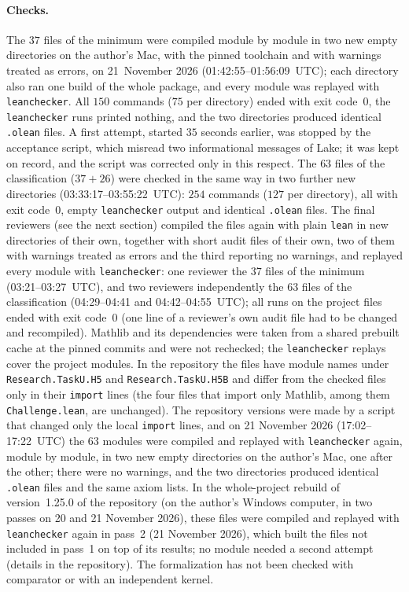 \documentclass[11pt]{article}
\theoremstyle{definition}
\theoremstyle{remark}
\newcommand{\repoversion}{1.25.0}
\begin{document}
{\paragraph{Checks.} The $37$ files of the minimum were compiled module by
module in two new empty directories on the author's Mac, with the pinned
toolchain and with warnings treated as errors, on 21~November 2026
(01:42:55--01:56:09~UTC); each directory also ran one build of the whole
package, and every module was replayed with \texttt{leanchecker}. All $150$
commands ($75$ per directory) ended with exit code~$0$, the
\texttt{leanchecker} runs printed nothing, and the two directories produced
identical \texttt{.olean} files. A first attempt, started $35$ seconds earlier, was
stopped by the acceptance script, which misread two informational messages of
Lake; it was kept on record, and the script was corrected only in this
respect. The $63$ files of the classification ($37+26$) were checked in the
same way in two further new directories (03:33:17--03:55:22~UTC): $254$
commands ($127$ per directory), all with exit code~$0$, empty
\texttt{leanchecker} output and identical \texttt{.olean} files. The final
reviewers (see the next section) compiled the files again with plain
\texttt{lean} in new directories of their own, together with short audit files
of their own, two of them with warnings treated as errors and the third
reporting no warnings, and replayed every module with
\texttt{leanchecker}: one reviewer the $37$ files of the minimum (03:21--03:27~UTC),
and two reviewers independently the $63$ files of the classification
(04:29--04:41 and 04:42--04:55~UTC); all runs on the project files ended with
exit code~$0$ (one line of a reviewer's own audit file had to be changed and
recompiled). Mathlib
and its dependencies were taken from a shared prebuilt cache at the pinned
commits and were not rechecked; the \texttt{leanchecker} replays cover the
project modules. In the repository the files have module names under
\texttt{Research.TaskU.H5} and \texttt{Research.TaskU.H5B} and differ from the
checked files only in their \texttt{import} lines (the four files that
import only Mathlib, among them \texttt{Challenge.lean}, are unchanged).
The repository versions were made by a script that changed only the local \texttt{import} lines, and on 21 November 2026 (17:02--17:22~UTC) the $63$ modules were compiled and replayed with \texttt{leanchecker} again, module by module, in two new empty directories on the author's Mac, one after the other; there were no warnings, and the two directories produced identical \texttt{.olean} files and the same axiom lists.
In the whole-project rebuild of version~\repoversion{} of the repository (on the author's Windows computer, in two passes on 20 and 21 November 2026), these files were compiled and replayed with \texttt{leanchecker} again in pass~2 (21 November 2026), which built the files not included in pass~1 on top of its results; no module needed a second attempt (details in the repository). The formalization has not been checked with comparator or with
an independent kernel.

\par}
\end{document}
